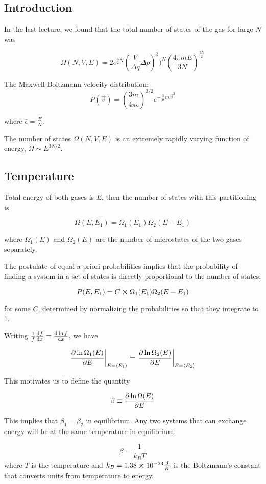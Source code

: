 \subsection{Introduction}

In the last lecture, we found that the total number of states of the gas for large $N$ was 

$$\Omega(N, V, E) = 2 e^{\frac{3}{2} N} (\frac{V}{\Delta q}{\Delta} p)^3)^N (\frac{4 \pi m E}{3N})^{\frac{3N}{2}}$$

The Maxwell-Boltzmann velocity distribution: $$P(\vec{v}) = (\frac{3m}{4 \pi \bar{\epsilon}})^{3/2} e^{-\frac{3}{4\bar{\epsilon}} m \vec{v}^2}$$

where $\bar{\epsilon} = \frac{E}{N}$.

The number of states $\Omega(N, V, E)$ is an extremely rapidly varying function of energy, $\Omega \sim E^{3N/2}$.

\subsection{Temperature}

Total energy of both gases is $E$, then the number of states with this partitioning is 

$$\Omega(E, E_1) = \Omega_1(E_1) \Omega_2(E-E_1)$$

where $\Omega_1(E)$ and $\Omega_2(E)$ are the number of microstates of the two gases separately.

The postulate of equal a priori probabilities implies that the probability of finding a system in a set of states is directly proportional to the number of states:

$$P(E, E_1) = C \cross \Omega_1(E_1) \Omega_2(E-E_1)$$

for some $C$, determined by normalizing the probabilities so that they integrate to 1.

Writing $\frac{1}{f} \dv{f}{x} = \dv{\ln f}{x}$, we have

$$\left. \pdv{\ln \Omega_1(E)}{E} \right\vert_{E = \langle E_1 \rangle} = \left. \pdv {\ln \Omega_2 (E)}{E} \right\vert_{E = \langle E_2 \rangle}$$

This motivates us to define the quantity 

$$\beta \equiv \pdv{\ln{\Omega}(E)}{E}$$

This implies that $\beta_1 = \beta_2$ in equilibrium. Any two systems that can exchange energy will be at the same temperature in equilibrium.

$$\beta = \frac{1}{k_B T}$$
where $T$ is the temperature and $k_B = 1.38 \cross 10^{-23} \frac{J}{K}$ is the Boltzmann's constant that converts units from temperature to energy.

